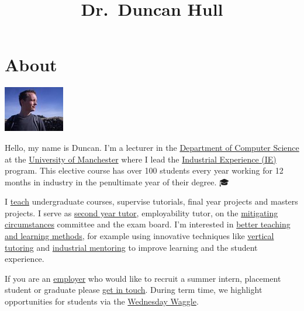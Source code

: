 \documentclass[12pt,]{book}
\title{Dr.~Duncan Hull}
\author{}
\date{}
\begin{document}
\maketitle

{
\setcounter{tocdepth}{1}
\tableofcontents
}
\hypertarget{about}{%
\chapter*{About}\label{about}}

\begin{center}\includegraphics[width=0.25\linewidth]{images/me-blue} \end{center}

Hello, my name is Duncan. I'm a lecturer in the \href{https://www.cs.manchester.ac.uk/}{Department of Computer Science} at the \href{https://www.manchester.ac.uk}{University of Manchester} where I lead the \href{https://www.cs.manchester.ac.uk/study/undergraduate/industrial-experience/}{Industrial Experience (IE)} program. This elective course has over 100 students every year working for 12 months in industry in the penultimate year of their degree. 🎓

I \protect\hyperlink{teaching}{teach} undergraduate courses, supervise tutorials, final year projects and masters projects. I serve as \href{http://studentnet.cs.manchester.ac.uk/ugt/year2/}{second year tutor}, employability tutor, on the \href{http://www.studentsupport.manchester.ac.uk/study-support/mitigating-circumstances/}{mitigating circumstances} committee and the exam board. I'm interested in \protect\hyperlink{research}{better teaching and learning methods}, for example using innovative techniques like \protect\hyperlink{vertical-tutoring}{vertical tutoring} and \href{https://www.cs.manchester.ac.uk/connect/business-engagement/industrial-mentoring/}{industrial mentoring} to improve learning and the student experience.

If you are an \protect\hyperlink{employers}{employer} who would like to recruit a summer intern, placement student or graduate please \protect\hyperlink{contact}{get in touch}. During term time, we highlight opportunities for students via the \href{https://waggle.cs.manchester.ac.uk/waggle/about}{Wednesday Waggle}. 🐝
\end{document}
